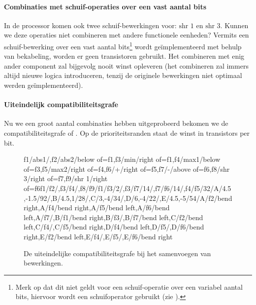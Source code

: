 \paragraph{Combinaties met schuif-operaties over een vast aantal bits}In de processor komen ook twee schuif-bewerkingen voor: $\mbox{shr 1}$ en $\mbox{shr 3}$. Kunnen we deze operaties niet combineren met andere functionele eenheden? Vermits een schuif-bewerking over een vast aantal bits\footnote{Merk op dat dit niet geldt voor een schuif-operatie over een variabel aantal bits, hiervoor wordt een schuifoperator gebruikt (zie ).} wordt ge\"implementeerd met behulp van bekabeling, worden er geen transistoren gebruikt. Het combineren met enig ander component zal bijgevolg nooit winst opleveren (het combineren zal immers altijd nieuwe logica introduceren, tenzij de originele bewerkingen niet optimaal werden ge\"implementeerd).
\paragraph{Uiteindelijk compatibiliteitsgrafe} Nu we een groot aantal combinaties hebben uitgeprobeerd bekomen we de compatibiliteitsgrafe of . Op de prioriteitsranden staat de winst in transistors per bit.
\begin{figure}[hbt]
\centering
\begin{compatibilitygraph}{f1/abs1/,f2/abs2/{below of=f1},f3/min/{right of=f1},f4/max1/below of=f3,f5/max2/right of=f4,f6/+/right of=f5,f7/-/above of=f6,f8/shr 3/right of=f7,f9/shr 1/right of=f6}{f1/f2/,f3/f4/,f8/f9/}{f1/f3/2/,f3/f7/14/,f7/f6/14/,f4/f5/32/}{A/{4.5,-1.5}/92/,B/{4.5,1}/28/,C/{3,-4}/34/,D/{6,-4}/22/,E/{4.5,-5}/54/}{A/f2/bend right,A/f4/bend right,A/f5/bend left,A/f6/bend left,A/f7/,B/f1/bend right,B/f3/,B/f7/bend left,C/f2/bend left,C/f4/,C/f5/bend right,D/f4/bend left,D/f5/,D/f6/bend right,E/f2/bend left,E/f4/,E/f5/,E/f6/bend right}
\end{compatibilitygraph}
\caption{De uiteindelijke compatibiliteitsgrafe bij het samenvoegen van bewerkingen.}
\end{figure}
